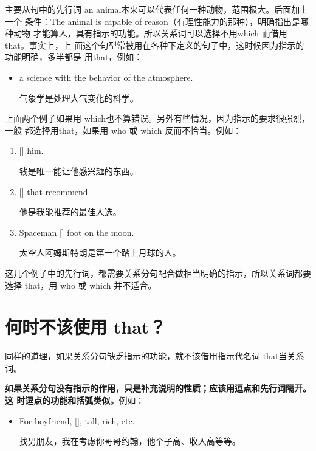 主要从句中的先行词 an animal本来可以代表任何一种动物，范围极大。后面加上一个
条件：The animal is capable of reason（有理性能力的那种），明确指出是哪种动物
才能算人，具有指示的功能。所以关系词可以选择不用which 而借用that。事实上，上
面这个句型常被用在各种下定义的句子中，这时候因为指示的功能明确，多半都是
用that，例如：

\begin{itemize}
\item {}  a science 
   with the behavior of the atmosphere.

  气象学是处理大气变化的枓学。
\end{itemize}

上面两个例子如果用 which也不算错误。另外有些情况，因为指示的要求很强烈，一般
都选择用that，如果用 who 或 which 反而不恰当。例如：
\begin{enumerate}
\item {}  []
    him.

  钱是唯一能让他感兴趣的东西。
\item {} [] that
    recommend.

  他是我能推荐的最佳人选。
\item Spaceman   []
    foot on the moon.

  太空人阿姆斯特朗是第一个踏上月球的人。
\end{enumerate}

这几个例子中的先行词，都需要关系分句配合做相当明确的指示，所以关系词都要选择
that，用 who 或 which 并不适合。

\section{何时不该使用 that？}

同样的道理，如果关系分句缺乏指示的功能，就不该借用指示代名词 that当关系词。

\textbf{如果关系分句没有指示的作用，只是补充说明的性质；应该用逗点和先行词隔开。这
  时逗点的功能和括弧类似。}例如：

\begin{itemize}
\item For boyfriend,  [],   tall, rich, etc.

  找男朋友，我在考虑你哥哥约翰，他个子高、收入高等等。
\end{itemize}

